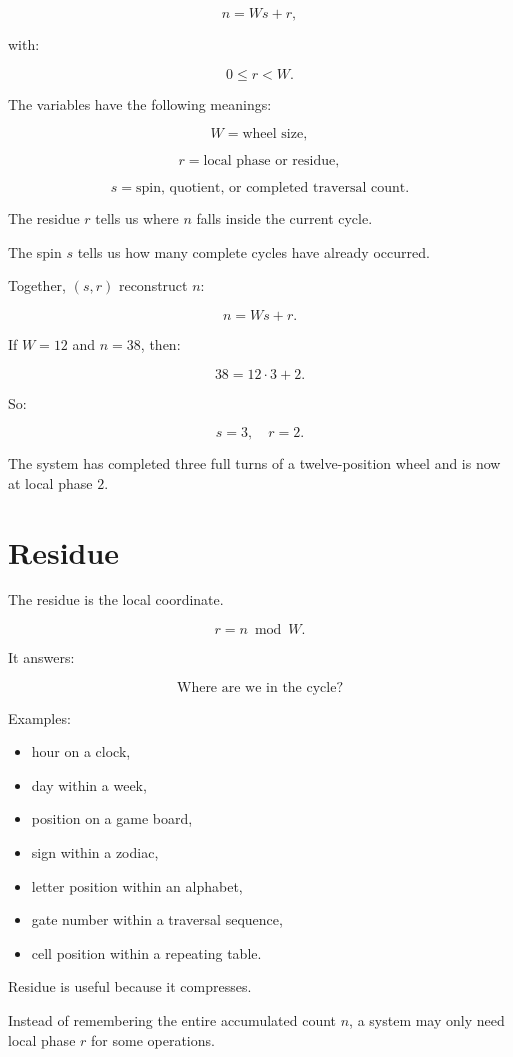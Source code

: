 \documentclass[11pt]{book}
\begin{document}
\[
n = Ws + r,
\]

with:

\[
0 \leq r < W.
\]

The variables have the following meanings:

\[
W = \text{wheel size},
\]

\[
r = \text{local phase or residue},
\]

\[
s = \text{spin, quotient, or completed traversal count}.
\]

The residue \(r\) tells us where \(n\) falls inside the current cycle.

The spin \(s\) tells us how many complete cycles have already occurred.

Together, \((s,r)\) reconstruct \(n\):

\[
n = Ws + r.
\]

If \(W=12\) and \(n=38\), then:

\[
38 = 12 \cdot 3 + 2.
\]

So:

\[
s=3,
\quad
r=2.
\]

The system has completed three full turns of a twelve-position wheel and is now at local phase \(2\).

\section{Residue}

The residue is the local coordinate.

\[
r = n \bmod W.
\]

It answers:

\[
\text{Where are we in the cycle?}
\]

Examples:

\begin{itemize}
    \item hour on a clock,
    \item day within a week,
    \item position on a game board,
    \item sign within a zodiac,
    \item letter position within an alphabet,
    \item gate number within a traversal sequence,
    \item cell position within a repeating table.
\end{itemize}

Residue is useful because it compresses.

Instead of remembering the entire accumulated count \(n\), a system may only need local phase \(r\) for some operations.
\end{document}
